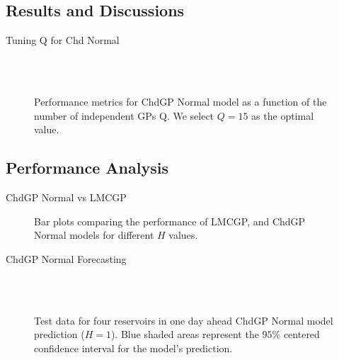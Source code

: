 \subsection{Results and Discussions}

\begin{frame}{Tuning Q for Chd Normal}
	\begin{figure}[htbp]
		\centering
		\setlength{} 
		\setlength{}
		\subfloat[CRPS]{}
		\subfloat[MSE]{}\\
		\vspace{-0.2cm}
		\subfloat[MSLL]{}
		\subfloat[NLPD]{}\\
		\vspace{-0.5cm}
		\caption{Performance metrics for ChdGP Normal model as a function of the number of independent GPs Q. We select $Q = 15$ as the optimal value.}
	\end{figure}
\end{frame}

\subsection{Performance Analysis}
\begin{frame}{ChdGP Normal vs LMCGP}
	\begin{figure}[htbp]
		\centering
		\setlength{}
		\setlength{}
		
		\subfloat[NLPD]{}
		\hfill
		\subfloat[MSLL]{}
		
		\caption{Bar plots comparing the performance of LMCGP, and ChdGP Normal models for different \(H\) values.}
	\end{figure}
\end{frame}

\begin{frame}{ChdGP Normal Forecasting}
	\justifying
	\begin{figure}[htbp]
		\setlength{} 
		\setlength{}
		
		\subfloat[$T.$]{}\hfill
		\subfloat[$A.$]{}\\[-0.5cm]
		\subfloat[$I.$]{}\hfill
		\subfloat[$O.$]{}\\[-0.4cm]
		
		\caption{Test data for four reservoirs in one day ahead ChdGP Normal model prediction ($H=1$). Blue shaded areas represent the $95\%$ centered confidence interval for the model's prediction.}
	\end{figure}
\end{frame}

